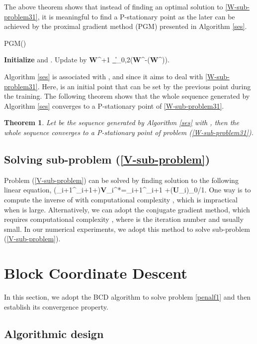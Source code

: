 \documentclass[journal]{IEEEtran}
\newtheorem{theorem}{Theorem}
\newcommand{\be}{}
\def\I{{\bf I}}
\def\U{{\bf U}}
\def\V{{\bf V}}
\def\W{{\bf W}}
\begin{document}
The above theorem shows that instead of finding an optimal solution to \eqref{W-sub-problem31}, it is meaningful to find a P-stationary point as the later can be achieved by the proximal gradient method (PGM) \cite{Beck2019} presented in Algorithm \ref{ses}.
 \begin{algorithm}[H] \caption{PGM()}\label{ses}
	\begin{algorithmic}[1]
\STATE \textbf{Initialize}    and  .
	\FOR{}	
	 \STATE  Update   by
	  \be\label{P-CW-l}
    \W^{\ell+1} _{\beta \lambda\|\cdot\|_{0,2}}(\W^{\ell}-\beta \nabla \Psi(\W^{\ell})).\ee
\ENDFOR
\RETURN 
	\end{algorithmic}
\end{algorithm}
Algorithm \ref{ses}  is associated with , and   since it aims to deal with \eqref{W-sub-problem31}. Here,   is an initial point that can be set by the previous point during the training.  The following theorem shows that the whole sequence generated by Algorithm \ref{ses}  converges to a  P-stationary point of  \eqref{W-sub-problem31}.
\begin{theorem} \label{PGM-converge}
Let  be the sequence generated by Algorithm \ref{ses} with , then the whole sequence converges to a P-stationary point of problem (\ref{W-sub-problem31}).
\end{theorem}

\subsection{Solving  sub-problem (\ref{V-sub-problem}) }
{Problem (\ref{V-sub-problem}) can be solved by finding  solution  to the following linear equation,
\be\label{V-sub-problem-sol}
(\tau\W_{i+1}^\top\W_{i+1}+\pi \I)\V_i^*=\tau\W_{i+1}^\top\U_{i+1} +\pi(\U_{i})_{0/1}.
\ee
One way is to compute the inverse of  with computational complexity , which is impractical when  is large.  Alternatively, we can adopt the conjugate gradient method, which requires computational complexity , where  is the iteration number and usually small. In our numerical experiments, we adopt this method to solve sub-problem (\ref{V-sub-problem}).}
\section{Block Coordinate Descent} \label{Section-algorithm}
In this section, we adopt the BCD  algorithm  to solve problem \eqref{penalf1} and then establish its convergence property.

\subsection{Algorithmic design}
\end{document}
